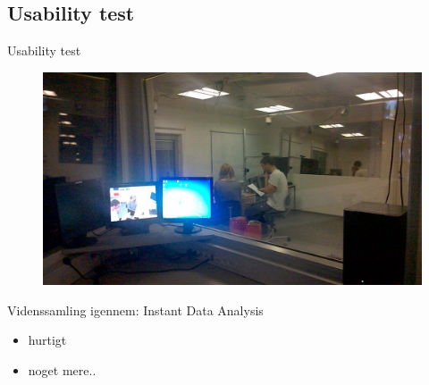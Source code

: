 \subsection{Usability test}
\begin{frame}{Usability test}
	\begin{figure}
		\centering
		\includegraphics{slides/Heider/subjectRoom}
	\end{figure}
	Videnssamling igennem: Instant Data Analysis
	\begin{itemize}
		\item hurtigt
		\item noget mere..
	\end{itemize}
\end{frame}